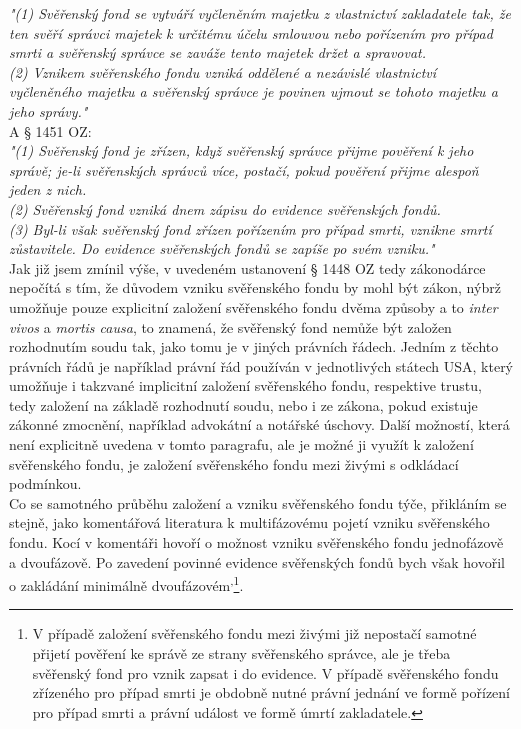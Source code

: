 \documentclass{article}
\begin{document}
\noindent\textit{"(1) Svěřenský fond se vytváří vyčleněním majetku z vlastnictví zakladatele tak, že ten svěří správci majetek k určitému účelu smlouvou nebo pořízením pro případ smrti a svěřenský správce se zaváže tento majetek držet a spravovat.\\
(2) Vznikem svěřenského fondu vzniká oddělené a nezávislé vlastnictví vyčleněného majetku a svěřenský správce je povinen ujmout se tohoto majetku a jeho správy."}\\

A § 1451 OZ:\\

\noindent\textit{"(1) Svěřenský fond je zřízen, když svěřenský správce přijme pověření k jeho správě; je-li svěřenských správců více, postačí, pokud pověření přijme alespoň jeden z nich.\\
(2) Svěřenský fond vzniká dnem zápisu do evidence svěřenských fondů.\\
(3) Byl-li však svěřenský fond zřízen pořízením pro případ smrti, vznikne smrtí zůstavitele. Do evidence svěřenských fondů se zapíše po svém vzniku."}\\

Jak již jsem zmínil výše, v uvedeném ustanovení § 1448 OZ tedy zákonodárce nepočítá s tím, že důvodem vzniku svěřenského fondu by mohl být zákon, nýbrž umožňuje pouze explicitní založení svěřenského fondu dvěma způsoby a to \textit{inter vivos} a \textit{mortis causa}, to znamená, že svěřenský fond nemůže být založen rozhodnutím soudu tak, jako tomu je v jiných právních řádech. Jedním z těchto právních řádů je například právní řád používán v jednotlivých státech USA, který umožňuje i takzvané implicitní založení svěřenského fondu, respektive trustu, tedy založení na základě rozhodnutí soudu, nebo i ze zákona, pokud existuje zákonné zmocnění, například advokátní a notářské úschovy. Další možností, která není explicitně uvedena v tomto paragrafu, ale je možné ji využít k založení svěřenského fondu, je založení svěřenského fondu mezi živými s odkládací podmínkou.\\

Co se samotného průběhu založení a vzniku svěřenského fondu týče, přikláním se stejně, jako komentářová literatura k multifázovému pojetí vzniku svěřenského fondu. Kocí v komentáři hovoří o možnost vzniku svěřenského fondu jednofázově a dvoufázově. Po zavedení povinné evidence svěřenských fondů bych však hovořil o zakládání minimálně dvoufázovém\textsuperscript{,}\footnote{V případě založení svěřenského fondu mezi živými již nepostačí samotné přijetí pověření ke správě ze strany svěřenského správce, ale je třeba svěřenský fond pro vznik zapsat i do evidence. V případě svěřenského fondu zřízeného pro případ smrti je obdobně nutné právní jednání ve formě pořízení pro případ smrti a právní událost ve formě úmrtí zakladatele.}.\\
\end{document}
